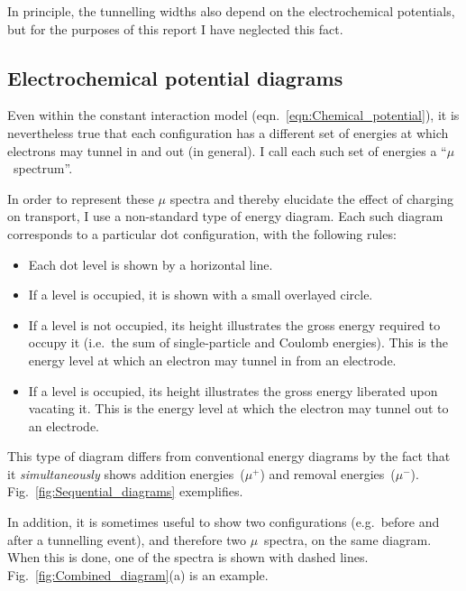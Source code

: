 \documentclass[a4paper,11pt]{article}
\begin{document}
    In principle, the tunnelling widths also depend on the electrochemical potentials, but for the purposes of this report I have neglected this fact.

    \subsection{Electrochemical potential diagrams}
    Even within the constant interaction model (eqn.~\ref{eqn:Chemical_potential}), it is nevertheless true that each configuration has a different set of energies at which electrons may tunnel in and out (in general). I call each such set of energies a ``$\mu$~spectrum''.

    In order to represent these $\mu$ spectra and thereby elucidate the effect of charging on transport, I use a non-standard type of energy diagram. Each such diagram corresponds to a particular dot configuration, with the following rules:
    \begin{itemize}
        \item Each dot level is shown by a horizontal line.
        \item If a level is occupied, it is shown with a small overlayed circle.
        \item If a level is not occupied, its height illustrates the gross energy required to occupy it (i.e.\ the sum of single-particle and Coulomb energies). This is the energy level at which an electron may tunnel in from an electrode.
        \item If a level is occupied, its height illustrates the gross energy liberated upon vacating it. This is the energy level at which the electron may tunnel out to an electrode.
    \end{itemize}
    This type of diagram differs from conventional energy diagrams by the fact that it \textit{simultaneously} shows addition energies~($\mu^+$) and removal energies~($\mu^-$). Fig.~\ref{fig:Sequential_diagrams} exemplifies.

    In addition, it is sometimes useful to show two configurations (e.g.\ before and after a tunnelling event), and therefore two $\mu$~spectra, on the same diagram. When this is done, one of the spectra is shown with dashed lines. Fig.~\ref{fig:Combined_diagram}(a) is an example.
\end{document}
